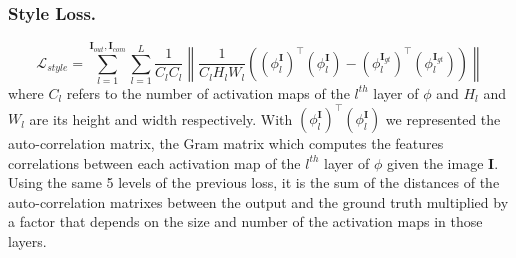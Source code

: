 \documentclass[10pt,twocolumn,letterpaper]{article}
\newcommand\norm[1]{\left\lVert#1\right\rVert}
\begin{document}
\subsubsection{Style Loss.}
\begin{dmath}
        \mathcal{L}_{style} = \sum^{\mathbf{I}_{out},\mathbf{I}_{com}}_{l=1}
        \sum^L_{l=1} \frac{1}{C_l C_l} \norm{ \frac{1}{C_l H_l W_l}
        ((\phi^{\mathbf{I}}_l)^\top(\phi^{\mathbf{I}}_l) -
        (\phi^{\mathbf{I}_{gt}}_l)^\top(\phi^{\mathbf{I}_{gt}}_l)  )}
\end{dmath}
where \(C_l\) refers to the number of activation maps of the \(l^{th}\) layer of
\(\phi\) and \(H_l\) and \(W_l\) are its height and width respectively. With
\((\phi^{\mathbf{I}}_l)^\top(\phi^{\mathbf{I}}_l)\) we represented the
auto-correlation matrix, the Gram matrix\cite{gatys1508neural} which computes
the features correlations between each activation map of the \(l^{th}\) layer of
\(\phi\) given the image \(\mathbf{I}\).\\
Using the same 5 levels of the previous loss, it is the sum of the distances of
the auto-correlation matrixes between the output and the ground truth multiplied
by a factor that depends on the size and number of the activation maps in those
layers.
\end{document}
